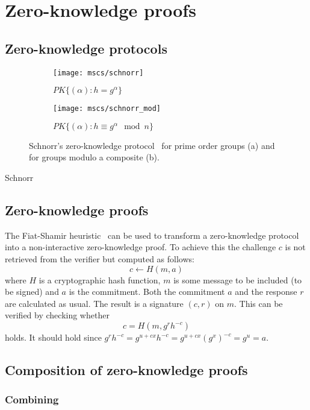 \section{Zero-knowledge proofs}

\subsection{Zero-knowledge protocols}

\begin{figure}
  \centering
  \begin{subfigure}[b]{0.45\textwidth}
    \texttt{[image: mscs/schnorr]}
    \caption{$PK\{(\alpha) : h = g^\alpha \}$}
    \label{msc:schnorr}
  \end{subfigure}
  \quad
  \begin{subfigure}[b]{0.45\textwidth}
    \texttt{[image: mscs/schnorr\_mod]}
    \caption{$PK\{(\alpha) : h \equiv g^\alpha \mod n \}$}
    \label{msc:schnorr_mod}
  \end{subfigure}
  \caption{Schnorr's zero-knowledge protocol~\cite{Schnorr1991} for prime order groups (a) and for groups modulo a composite (b).}
  \label{fig:schnorr}
\end{figure}

Schnorr

\subsection{Zero-knowledge proofs}

The Fiat-Shamir heuristic~\cite{FiatShamir1987} can be used to transform a zero-knowledge protocol into a non-interactive zero-knowledge proof. To achieve this the challenge $c$ is not retrieved from the verifier but computed as follows: $$c \leftarrow H(m,a)$$ where $H$ is a cryptographic hash function, $m$ is some message to be included (to be signed) and $a$ is the commitment. Both the commitment $a$ and the response $r$ are calculated as usual. The result is a signature $(c,r)$ on $m$. This can be verified by checking whether $$c = H(m, g^r h^{-c})$$ holds. It should hold since $g^r h^{-c} = g^{u + cx} h^{-c} = g^{u + cx} (g^x)^{-c} = g^u = a$.

\subsection{Composition of zero-knowledge proofs}

\subsubsection{Combining}

